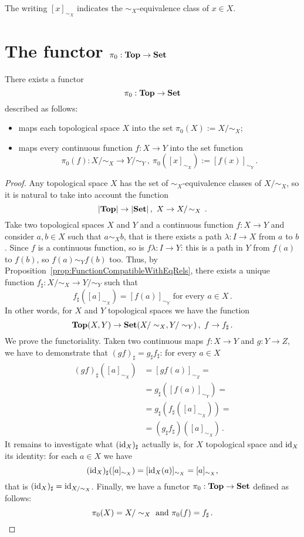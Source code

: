 The writing \([x]_{\sim_X}\) indicates the \(\sim_X\)-equivalence class of \(x \in X\).

\section{The functor \(\pi_0 : \mathbf{Top} \to \mathbf{Set}\)}

\begin{proposition}
There exists a functor
\[\pi_0 : \mathbf{Top} \to \mathbf{Set}\]
described as follows:
\begin{itemize}
\item maps each topological space \(X\) into the set \(\pi_0(X) := X/\sim_X\);
\item maps every continuous function \(f : X \to Y\) into the set function
\[\pi_0(f) : X/\!\sim_X \to Y/\!\sim_Y\,, \ \pi_0([x]_{\sim_X}) := [f(x)]_{\sim_Y}\,.\]
\end{itemize}
\end{proposition}

\begin{proof}
Any topological space \(X\) has the set of \(\sim_X\)-equivalence classes of \(X/\!\sim_X\), so it is natural to take into account the function
\[\lvert\mathbf{Top}\rvert \to \lvert\mathbf{Set}\rvert\,, \ X \to X/\!\sim_X\,.\]
Take two topological spaces \(X\) and \(Y\) and a continuous function \(f : X \to Y\) and consider \(a, b \in X\) such that \(a \sim_X b\), that is there exists a path \(\lambda : I \to X\) from \(a\) to \(b\). Since \(f\) is a continuous function, so is \(f\lambda : I \to Y\): this is a path in \(Y\) from \(f(a)\) to \(f(b)\), so \(f(a) \sim_Y f(b)\) too. Thus, by Proposition~\ref{prop:FunctionCompatibleWithEqRels}, there exists a unique function \(f_\sharp : X/\sim_X \to Y/\sim_Y\) such that
\[f_\sharp([a]_{\sim_X}) = [f(a)]_{\sim_Y} \text{ for every } a \in X\,.\]
In other words, for \(X\) and \(Y\) topological spaces we have the function
\[\mathbf{Top}(X, Y) \to \mathbf{Set}(X/\sim_X, Y/\sim_Y)\,, \ f \to f_\sharp\,.\]
We prove the functoriality. Taken two continuous maps \(f : X \to Y\) and \(g : Y \to Z\), we have to demonstrate that \((gf)_\sharp = g_\sharp f_\sharp\): for every \(a \in X\)
\begin{align*}
(gf)_\sharp([a]_{\sim_X}) & = [gf(a)]_{\sim_Z} = \\
                          & = g_\sharp([f(a)]_{\sim_Y}) = \\
                          & = g_\sharp(f_\sharp([a]_{\sim_X})) = \\
                          & = (g_\sharp f_\sharp)([a]_{\sim_X})\,.
\end{align*}
It remains to investigate what \((\text{id}_X)_\sharp\) actually is, for \(X\) topological space and \(\text{id}_X\) its identity: for each \(a \in X\) we have
\[(\text{id}_X)_\sharp([a]_{\sim_X}) = [\text{id}_X(a)]_{\sim_X} = [a]_{\sim_X},\]
that is \((\text{id}_X)_\sharp = \text{id}_{X/\sim_X}\). Finally, we have a functor \(\pi_0 : \mathbf{Top} \to \mathbf{Set}\) defined as follows:
\[\pi_0(X) = X/\sim_X \text{ and } \pi_0(f) = f_\sharp\,.\qedhere\]
\end{proof}


